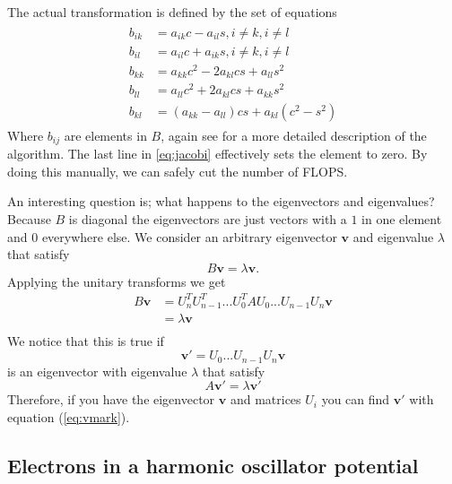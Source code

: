 \documentclass[reprint,english,notitlepage,nofootinbib]{revtex4-1}  %
\begin{document}
The actual transformation is defined by the set of equations
\begin{align}
\begin{split}
	b_{ik} &= a_{ik}c - a_{il}s, i \neq k, i \neq l \\
	b_{il} &= a_{il}c + a_{ik}s, i \neq k, i \neq l \\
	b_{kk} &= a_{kk}c^2 - 2a_{kl}cs + a_{ll}s^2 \\
	b_{ll} &= a_{ll}c^2 + 2a_{kl}cs + a_{kk}s^2 \\
	b_{kl} &= (a_{kk} - a_{ll} )cs + a_{kl}(c^2 - s^2)
	\label{eq:jacobi}
\end{split}
\end{align}
Where $b_{ij}$ are elements in $B$, again see \citep{lecnotes} for a more detailed description of the algorithm. The last line in \ref{eq:jacobi} effectively sets the element to zero. By doing this manually, we can safely cut the number of FLOPS.

An interesting question is; what happens to the eigenvectors and eigenvalues? Because $B$ is diagonal the eigenvectors are just vectors with a $1$ in one element and $0$ everywhere else. We consider an arbitrary eigenvector $\mathbf{v}$ and eigenvalue $\lambda$ that satisfy
\begin{equation*}
	B\mathbf{v} = \lambda \mathbf{v} .
\end{equation*}
Applying the unitary transforms we get
\begin{align*}
	B\mathbf{v} &= U_n^T U_{n-1}^T ... U_0^T A U_0 ... U_{n-1}U_n \mathbf{v} \\
	&= \lambda \mathbf{v} \\
 \end{align*}
We notice that this is true if
\begin{equation}
	\mathbf{v'} = U_0 ... U_{n-1}U_n \mathbf{v}
	\label{eq:vmark}
\end{equation}
is an eigenvector with eigenvalue $\lambda$ that satisfy
\begin{equation*}
	A \mathbf{v}' = \lambda \mathbf{v}'
\end{equation*}
Therefore, if you have the eigenvector $\mathbf{v}$ and matrices $U_i$ you can find $\mathbf{v}'$ with equation (\ref{eq:vmark}).


\subsection{Electrons in a harmonic oscillator potential}
\end{document}
